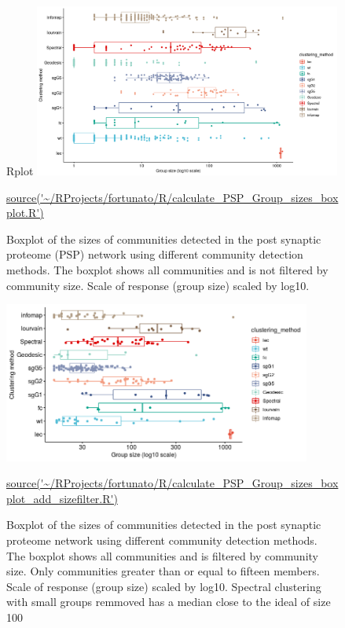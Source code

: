 \begin{figure}Rplot
    \centering
    \includegraphics[width=0.9\textwidth]{images/Rplot_boxplot_group_sizes_different_methods_size_1_or_greater.png}
    \caption[Boxplot of community size algorithms on PSP]{Boxplot of  
    the sizes of communities detected in the post synaptic proteome (PSP) network using different community detection methods. The boxplot shows all communities and is not filtered by community size. Scale of response (group size) scaled by log10.}
    \tiny\url{source('~/RProjects/fortunato/R/calculate_PSP_Group_sizes_boxplot.R')}
    \label{fig:community_sizes_no_size_filter}
\end{figure}


\begin{figure}
    \centering
    \includegraphics[width=0.9\textwidth]{images/chapter_community_detection/ggplot2/community_sizes_PSP/Rplot_PSP_groupsizes_clustering_size_filter_fifteen.png}
    \caption{Boxplot of  
    the sizes of communities detected in the post synaptic proteome network using different community detection methods. The boxplot shows all communities and is filtered by community size. Only communities greater than or equal to fifteen members. Scale of response (group size) scaled by log10. Spectral clustering with small groups remmoved has a median close to the ideal of size 100}
    \tiny\url{source('~/RProjects/fortunato/R/calculate_PSP_Group_sizes_boxplot_add_sizefilter.R')}
    \label{fig:community_sizes_size_filter_added}
\end{figure}





